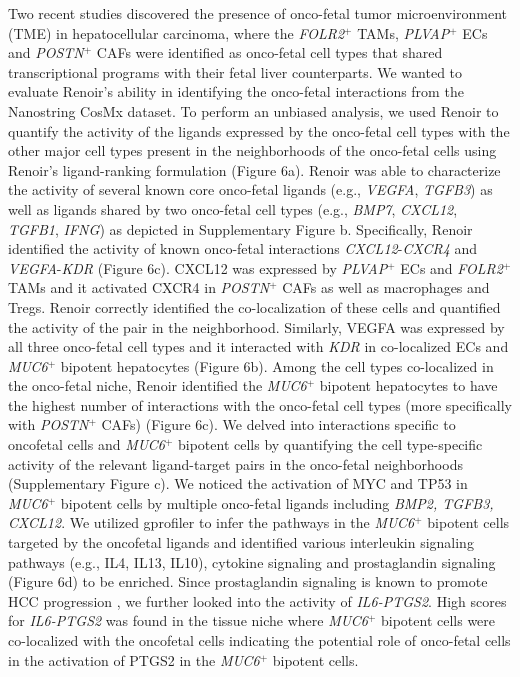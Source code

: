 Two recent studies discovered the presence of onco-fetal tumor microenvironment (TME) in hepatocellular carcinoma, where the \textit{FOLR2}$^{+}$ TAMs, \textit{PLVAP}$^{+}$ ECs and \textit{POSTN}$^{+}$ CAFs were identified as onco-fetal cell types that shared transcriptional programs with their fetal liver counterparts. We wanted to evaluate Renoir's ability in identifying the onco-fetal interactions from the Nanostring CosMx dataset. To perform an unbiased analysis, we used Renoir to quantify the activity of the ligands expressed by the onco-fetal cell types with the other major cell types present in the neighborhoods of the onco-fetal cells using Renoir's ligand-ranking formulation (Figure 6a). Renoir was able to characterize the activity of several known core onco-fetal ligands (e.g., \textit{VEGFA}, \textit{TGFB3}) as well as ligands shared by two onco-fetal cell types (e.g., \textit{BMP7}, \textit{CXCL12}, \textit{TGFB1}, \textit{IFNG}) as depicted in Supplementary Figure b. Specifically, Renoir identified the activity of known onco-fetal interactions \textit{CXCL12}-\textit{CXCR4} and \textit{VEGFA}-\textit{KDR} (Figure 6c). CXCL12 was expressed by \textit{PLVAP}$^{+}$ ECs and \textit{FOLR2}$^{+}$ TAMs and it activated CXCR4 in \textit{POSTN}$^{+}$ CAFs as well as macrophages and Tregs. Renoir correctly identified the co-localization of these cells and quantified the activity of the pair in the neighborhood. Similarly, VEGFA was expressed by all three onco-fetal cell types and it interacted with \textit{KDR} in co-localized ECs and \textit{MUC6}$^{+}$ bipotent hepatocytes (Figure 6b). Among the cell types co-localized in the onco-fetal niche, Renoir identified the \textit{MUC6}$^{+}$ bipotent hepatocytes to have the highest number of interactions with the onco-fetal cell types (more specifically with \textit{POSTN}$^{+}$ CAFs) (Figure 6c). We delved into interactions specific to oncofetal cells and \textit{MUC6}$^{+}$ bipotent cells by quantifying the cell type-specific activity of the relevant ligand-target pairs in the onco-fetal neighborhoods (Supplementary Figure c). We noticed the activation of MYC and TP53 in \textit{MUC6}$^{+}$ bipotent cells by multiple onco-fetal ligands including \textit{BMP2, TGFB3, CXCL12}. We utilized gprofiler \citep{gProfiler} to infer the  pathways in the \textit{MUC6}$^{+}$ bipotent cells targeted by the oncofetal ligands and identified various interleukin signaling pathways (e.g., IL4, IL13, IL10), cytokine signaling and prostaglandin signaling (Figure 6d) to be enriched. Since prostaglandin signaling is known to promote HCC progression \citep{prostaglandin_pathway}, we further looked into the activity of \textit{IL6-PTGS2}. High scores for \textit{IL6-PTGS2} was found in the tissue niche where \textit{MUC6}$^{+}$ bipotent cells were co-localized with the oncofetal cells indicating the potential role of onco-fetal cells in the activation of PTGS2 in the \textit{MUC6}$^{+}$ bipotent cells. 

